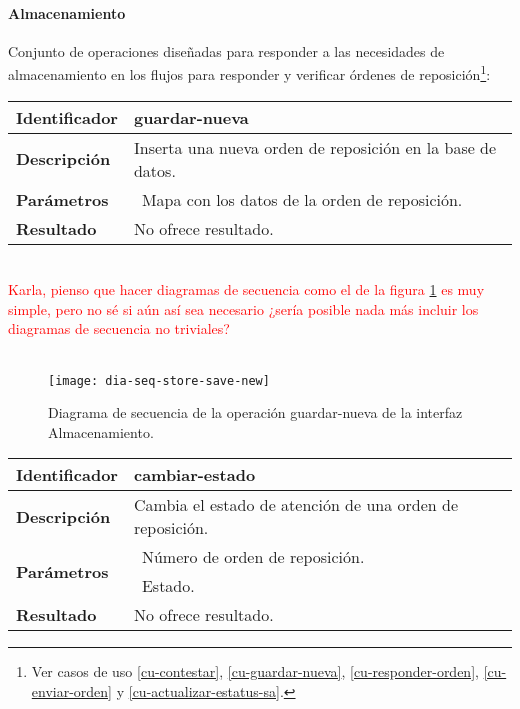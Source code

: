 \paragraph{Almacenamiento\\}
Conjunto de operaciones diseñadas para responder a las necesidades de almacenamiento en los flujos para responder y verificar órdenes de reposición\footnote{Ver casos de uso \ref{cu-contestar}, \ref{cu-guardar-nueva}, \ref{cu-responder-orden}, \ref{cu-enviar-orden} y \ref{cu-actualizar-estatus-sa}.}:
	\vspace{5mm}\\
	\begin{tabular}{|p{}|p{}|}
		\hline
		\textbf{Identificador}	& \textbf{guardar-nueva} \\
		\hline
		\hline
		\textbf{Descripción}	& Inserta una nueva orden de reposición en la base de datos.\\
		\hline
		\textbf{Parámetros} 	& \textbullet\, Mapa con los datos de la orden de reposición.\\
		\hline
		\textbf{Resultado}		& No ofrece resultado.\\
		\hline
	\end{tabular}
	\vspace{5mm}\\
	\textcolor{red}{Karla, pienso que hacer diagramas de secuencia como el de la figura \ref{fig:dia-seq-store-save-new} es muy simple, pero no sé si aún así sea necesario ¿sería posible nada más incluir los diagramas de secuencia no triviales?\\\\}
	\begin{figure}[h]
		\centering
		\texttt{[image: dia-seq-store-save-new]}
		\caption{Diagrama de secuencia de la operación guardar-nueva de la interfaz Almacenamiento.}
		\label{fig:dia-seq-store-save-new}
	\end{figure}
	\begin{tabular}{|p{}|p{}|}
		\hline
		\textbf{Identificador}	& \textbf{cambiar-estado} \\
		\hline
		\hline
		\textbf{Descripción}	& Cambia el estado de atención de una orden de reposición. \\
		\hline
		\multirow{2}{*}{\textbf{Parámetros}}	& \textbullet\, Número de orden de reposición.\\
												& \textbullet\, Estado.\\
		\hline
		\textbf{Resultado}		& No ofrece resultado.\\
		\hline
	\end{tabular}

